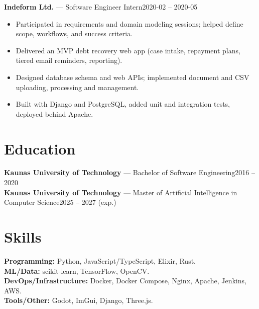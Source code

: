 \documentclass[10pt,a4paper]{article}
\newcommand{\entry}[3]{\noindent\textbf{#1} — #2\hfill #3\\}
\begin{document}
\vspace{0.2em}

\entry{Indeform Ltd.}{Software Engineer Intern}{2020-02 -- 2020-05}
\vspace{-0.8em}
\begin{itemize}[leftmargin=*,itemsep=0.0em,topsep=0.02em]
  \item Participated in requirements and domain modeling sessions; helped define scope, workflows, and success criteria.
  \item Delivered an MVP debt recovery web app (case intake, repayment plans, tiered email reminders, reporting).
  \item Designed database schema and web APIs; implemented document and CSV uploading, processing and management.
  \item Built with Django and PostgreSQL, added unit and integration tests, deployed behind Apache.
\end{itemize}

\section*{Education}
\entry{Kaunas University of Technology}{Bachelor of Software Engineering}{2016 -- 2020}
\entry{Kaunas University of Technology}{Master of Artificial Intelligence in Computer Science}{2025 -- 2027 (exp.)}
\vspace{-0.8em}

\section*{Skills}
\textbf{Programming:} Python, JavaScript/TypeScript, Elixir, Rust.\\
\textbf{ML/Data:} scikit-learn, TensorFlow, OpenCV.\\
\textbf{DevOps/Infrastructure:} Docker, Docker Compose, Nginx, Apache, Jenkins, AWS.\\
\textbf{Tools/Other:} Godot, ImGui, Django, Three.js.
\end{document}
